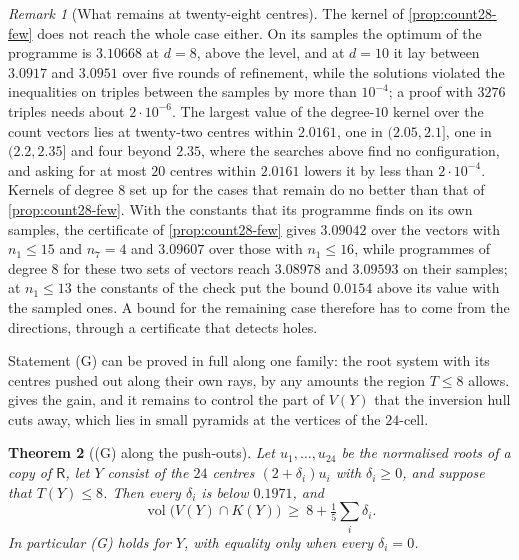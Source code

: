 \documentclass[11pt,reqno]{amsart}
\renewcommand{\_}{\origunderscore\allowbreak}
\numberwithin{equation}{section}
\theoremstyle{plain}
\newtheorem{thm}{Theorem}[section]
\theoremstyle{definition}
\theoremstyle{remark}
\newtheorem{remark}[thm]{Remark}
\newcommand{\Rt}{\mathsf{R}}                 %
\DeclareMathOperator{\vol}{vol}
\begin{document}
\begin{remark}[What remains at twenty-eight centres]
The kernel of \cref{prop:count28-few} does not reach the whole case either.
On its samples the optimum of the programme is $3.10668$ at $d=8$, above
the level, and at $d=10$ it lay between $3.0917$ and $3.0951$ over five
rounds of refinement, while the solutions violated the inequalities on triples
between the samples by more than $10^{-4}$; a proof with $3276$ triples
needs about $2\cdot10^{-6}$. The largest value of the degree-$10$ kernel over
the count vectors lies at twenty-two centres within $2.0161$, one in
$(2.05,2.1]$, one in $(2.2,2.35]$ and four beyond $2.35$, where the searches
above find no configuration, and asking for at most $20$ centres within
$2.0161$ lowers it by less than $2\cdot10^{-4}$. Kernels of degree $8$ set
up for the cases that remain do no better than that of
\cref{prop:count28-few}. With the constants that its programme finds on its
own samples, the certificate of \cref{prop:count28-few} gives $3.09042$ over
the vectors with $n_1\le15$ and $n_7=4$ and $3.09607$ over those with
$n_1\le16$, while programmes of degree $8$ for these two sets of vectors
reach $3.08978$ and $3.09593$ on their samples; at $n_1\le13$ the constants
of the check put the bound $0.0154$ above its value with the sampled ones.
A bound for the remaining
case therefore has to come from the directions, through a certificate that
detects holes.
\end{remark}

Statement (G) can be proved in full along one family: the root system with
its centres pushed out along their own rays, by any amounts the region
$T\le8$ allows.  gives the gain, and it remains to
control the part of $V(Y)$ that the inversion hull cuts away, which lies in
small pyramids at the vertices of the $24$-cell.

\begin{thm}[(G) along the push-outs]\label{thm:G-pushout}
Let $u_1,\dots,u_{24}$ be the normalised roots of a copy of $\Rt$, let $Y$
consist of the $24$ centres $(2+\delta_i)u_i$ with $\delta_i\ge0$, and
suppose that $T(Y)\le8$. Then every $\delta_i$ is below $0.1971$, and
\[
  \vol\bigl(V(Y)\cap K(Y)\bigr)\ \ge\ 8+\tfrac15\sum_i\delta_i .
\]
In particular (G) holds for $Y$, with equality only when every $\delta_i=0$.
\end{thm}
\end{document}
